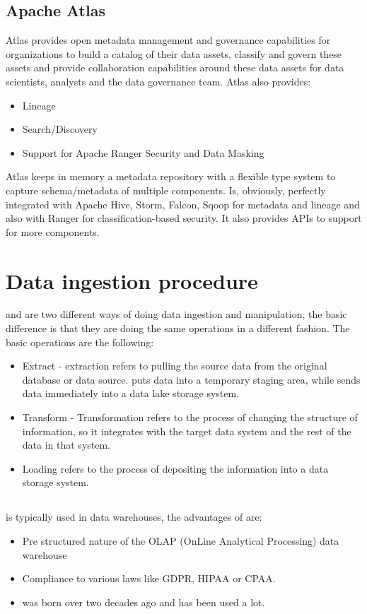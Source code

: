 \subsection{Apache Atlas}
Atlas provides open metadata management and governance capabilities for organizations to build a catalog of their data assets, classify and govern these assets and provide collaboration capabilities around these data assets for data scientists, analysts and the data governance team. \n
Atlas also provides:
\begin{itemize}
    \item Lineage
    \item Search/Discovery
    \item Support for Apache Ranger Security and Data Masking
\end{itemize}
Atlas keeps in memory a metadata repository with a flexible type system to capture schema/metadata of multiple components. \n
Is, obviously, perfectly integrated with Apache Hive, Storm, Falcon, Sqoop for metadata and lineage and also with Ranger for classification-based security. \n
It also provides APIs to support for more components. \n
\section{Data ingestion procedure}
\etl and \elt are two different ways of doing data ingestion and manipulation, the basic difference is that they are doing the same operations in a different fashion. \n
The basic operations are the following:
\begin{itemize}
    \item Extract - extraction refers to pulling the source data from the original database or data source. \etl puts data into a temporary staging area, while \elt sends data immediately into a data lake storage system.
    \item Transform - Transformation refers to the process of changing the structure of information, so it integrates with the target data system and the rest of the data in that system.
    \item Loading refers to the process of depositing the information into a data storage system.
\end{itemize}
\subsection{\etl}
\etl is typically used in data warehouses, the advantages of \etl are:
\begin{itemize}
    \item Pre structured nature of the OLAP (OnLine Analytical Processing) data warehouse
    \item Compliance to various laws like GDPR, HIPAA or CPAA.
    \item \etl was born over two decades ago and has been used a lot.
\end{itemize}
